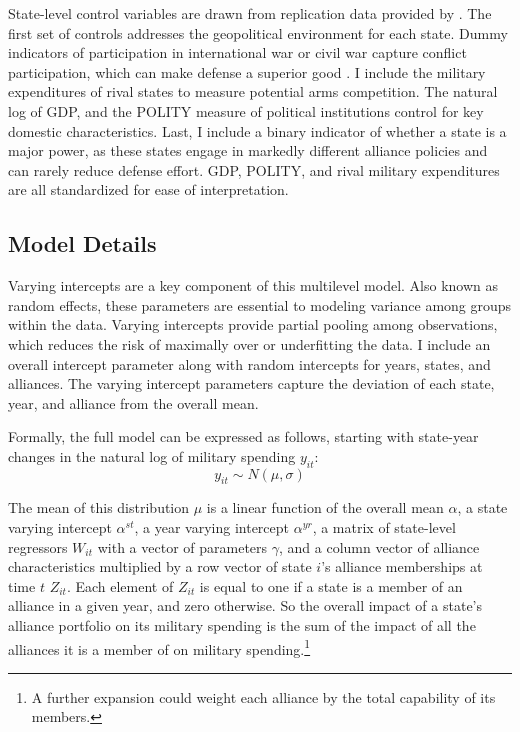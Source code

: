 \documentclass[12pt]{article}
\begin{document}
State-level control variables are drawn from replication data provided by \citet{DigiuseppePoast2016}. The first set of controls addresses the geopolitical environment for each state. Dummy indicators of participation in international war or civil war capture conflict participation, which can make defense a superior good \citep{OlsonZeckhauser1966}. I include the military expenditures of rival states to measure potential arms competition. The natural log of GDP, and the POLITY measure of political institutions control for key domestic characteristics. Last, I include a binary indicator of whether a state is a major power, as these states engage in markedly different alliance policies and can rarely reduce defense effort. GDP, POLITY, and rival military expenditures are all standardized for ease of interpretation. 


\subsection*{Model Details}

Varying intercepts are a key component of this multilevel model. Also known as random effects, these parameters are essential to modeling variance among groups within the data. Varying intercepts provide partial pooling among observations, which reduces the risk of maximally over or underfitting the data. I include an overall intercept parameter along with random intercepts for years, states, and alliances. The varying intercept parameters capture the deviation of each state, year, and alliance from the overall mean. 

Formally, the full model can be expressed as follows, starting with state-year changes in the natural log of military spending $y_{it}$:
\begin{equation}
y_{it} \sim N( \mu, \sigma) 
\end{equation}

The mean of this distribution $\mu$ is a linear function of the overall mean $\alpha$, a state varying intercept $\alpha^{st}$, a year varying intercept $\alpha^{yr}$, a matrix of state-level regressors $W_{it}$ with a vector of parameters $\gamma$, and a column vector of alliance characteristics multiplied by a row vector of state $i$'s alliance memberships at time $t$ $Z_{it}$. Each element of $Z_{it}$ is equal to one if a state is a member of an alliance in a given year, and zero otherwise. So the overall impact of a state's alliance portfolio on its military spending is the sum of the impact of all the alliances it is a member of on military spending.\footnote{A further expansion could weight each alliance by the total capability of its members.} 
\end{document}
